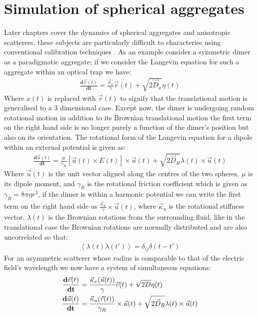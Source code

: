 \section{Simulation of spherical aggregates}
Later chapters cover the dynamics of spherical aggregates and anisotropic scatterers, these subjects are particularly difficult to characterise using conventional calibration techniques \cite{Li2008, Yogesha2011PreciseCO}. As an example consider a symmetric dimer as a paradigmatic aggregate; if we consider the Langevin equation for such a aggregate within an optical trap we have:
\begin{align}
	\frac{\mathbf{d}\vec{r}(t)}{\mathbf{dt}} = \frac{\vec{\kappa}_x}{\gamma}\vec{r}(t) + \sqrt{2\vec{D}_x}\eta(t)
\end{align}
Where $x(t)$ is replaced with $\vec{r}(t)$ to signify that the translational motion is generalised to a 3 dimensional case. Except now, the dimer is undergoing random rotational motion in addition to its Brownian translational motion the first term on the right hand side is no longer purely a function of the dimer's position but also on its orientation. The rotational form of the Langevin equation for a dipole within an external potential is given as:
\begin{align}
	\frac{\mathbf{d}\vec{u}(t)}{\mathbf{dt}} = \frac{\mu}{\gamma_R}\left[\vec{u}(t)\times E(t)\right]\times \vec{u}(t) + \sqrt{2\vec{D}_R}\lambda(t)\times \vec{u}(t)
\end{align}
Where $\vec{u}(t)$ is the unit vector aligned along the centres of the two spheres, $\mu$ is its dipole moment, and $\gamma_R$ is the rotational friction coefficient which is given as $\gamma_R = 8\pi\eta r^3$, if the dimer is within a harmonic potential we can write the first term on the right hand side as $\frac{\vec{\kappa}_u}{\gamma} \times \vec{u}(t)$, where $\vec{\kappa}_u$ is the rotational stiffness vector. $\lambda(t)$ is the Brownian rotations from the surrounding fluid, like in the translational case the Brownian rotations are normally distributed and are also uncorrelated so that:
\begin{align}
	\left<\lambda(t)\lambda(t')\right> = \delta_{ij}\delta(t-t')
\end{align}
For an asymmetric scatterer whose radius is comparable to that of the electric field's wavelength we now have a system of simultaneous equations:
\begin{align}
	\label{eq:full_langevin}
		\frac{\bold{d}\vec{r}(t)}{\bold{dt}} &= \frac{\vec{\kappa}_x(\vec{u}(t))}{\gamma}\vec{r}(t) + \sqrt{2D}\eta(t) \\
		\frac{\bold{d}\vec{u}(t)}{\bold{dt}} &= \frac{\vec{\kappa}_u(\vec{r}(t))}{\gamma_R}\times \vec{u}(t) + \sqrt{2\vec{D}_R}\lambda(t)\times \vec{u}(t)
\end{align}
